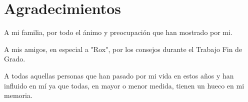\chapter{Agradecimientos}

A mi familia, por todo el ánimo y preocupación que han mostrado por mi.

A mis amigos, en especial a "Rox", por los consejos durante el Trabajo Fin de Grado.

A todas aquellas personas que han pasado por mi vida en estos años y han influido en mí ya que todas, en mayor o menor medida, tienen un hueco en mi memoria.


